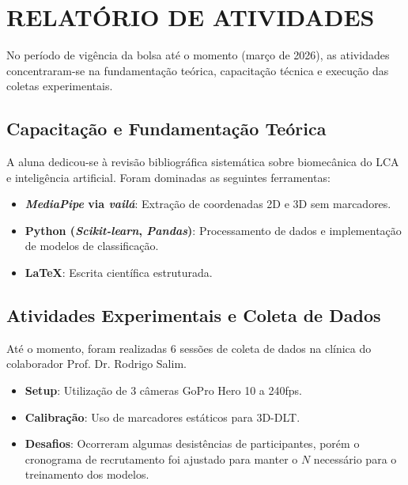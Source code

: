 \documentclass{article}
\begin{document}

\section{RELATÓRIO DE ATIVIDADES}
No período de vigência da bolsa até o momento (março de 2026), as atividades concentraram-se na fundamentação teórica, capacitação técnica e execução das coletas experimentais.

\subsection{Capacitação e Fundamentação Teórica}
A aluna dedicou-se à revisão bibliográfica sistemática sobre biomecânica do LCA e inteligência artificial. Foram dominadas as seguintes ferramentas:
\begin{itemize}
    \item \textbf{\textit{MediaPipe} via \textit{vailá}}: Extração de coordenadas 2D e 3D sem marcadores.
    \item \textbf{Python (\textit{Scikit-learn}, \textit{Pandas})}: Processamento de dados e implementação de modelos de classificação.
    \item \textbf{\LaTeX}: Escrita científica estruturada.
\end{itemize}

\subsection{Atividades Experimentais e Coleta de Dados}
Até o momento, foram realizadas 6 sessões de coleta de dados na clínica do colaborador Prof. Dr. Rodrigo Salim. 
\begin{itemize}
    \item \textbf{Setup}: Utilização de 3 câmeras GoPro Hero 10 a 240fps.
    \item \textbf{Calibração}: Uso de marcadores estáticos para 3D-DLT.
    \item \textbf{Desafios}: Ocorreram algumas desistências de participantes, porém o cronograma de recrutamento foi ajustado para manter o $N$ necessário para o treinamento dos modelos.
\end{itemize}
\end{document}
